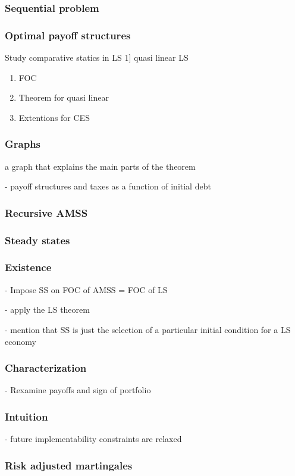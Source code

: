 \documentclass{beamer}
\begin{document}
 
 \begin{frame}
 \frametitle{Sequential problem}  
  \end{frame}
  
  
 
 \begin{frame}
  \frametitle{Optimal payoff structures}
Study comparative statics in LS
1] quasi linear LS
 
\begin{enumerate}
 \item FOC
 \item Theorem for quasi linear
 \item Extentions for CES
\end{enumerate}

  \end{frame}
  
  \begin{frame}
   \frametitle{Graphs }
    a graph that explains the main parts of the theorem
   
   - payoff structures and taxes as a function of initial debt
  \end{frame}

  
  
\begin{frame}
 \frametitle{Recursive AMSS}
\end{frame}


\begin{frame}
 \frametitle{Steady states}
\end{frame}

\begin{frame}
 \frametitle{Existence }
 
 - Impose SS on FOC of AMSS = FOC of LS

 - apply the LS theorem

 - mention that SS is just the selection of a particular initial condition for a LS economy
 
\end{frame}

\begin{frame}
 \frametitle{Characterization}
- Rexamine payoffs and sign of portfolio
 \end{frame}

 \begin{frame}
  \frametitle{Intuition}
  - future implementability constraints are relaxed
 \end{frame}

 \begin{frame}
  \frametitle{Risk adjusted martingales}
 \end{frame}
 
\end{document}
